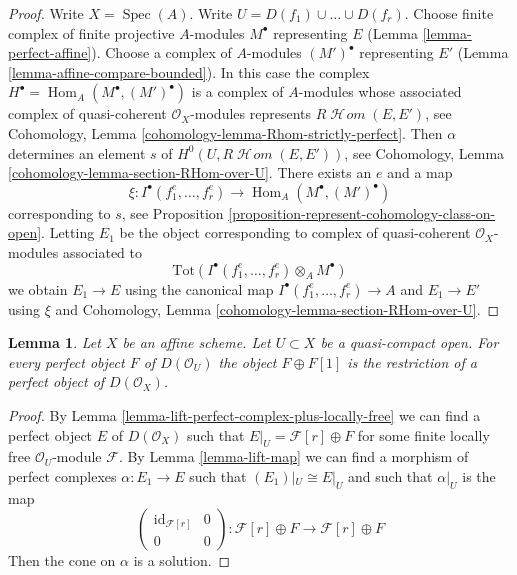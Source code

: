 \documentclass{stacks-project}
\theoremstyle{plain}
\newtheorem{lemma}[subsection]{Lemma}
\theoremstyle{definition}
\theoremstyle{remark}
\numberwithin{equation}{subsection}
\def\Spec{\mathop{\mathrm{Spec}}}
\def\Hom{\mathop{\mathrm{Hom}}\nolimits}
\def\SheafHom{\mathop{\mathcal{H}\!\mathit{om}}\nolimits}
\begin{document}
\begin{proof}
Write $X = \Spec(A)$. Write $U = D(f_1) \cup \ldots \cup D(f_r)$. Choose
finite complex of finite projective $A$-modules $M^\bullet$ representing
$E$ (Lemma \ref{lemma-perfect-affine}). Choose a complex of $A$-modules
$(M')^\bullet$ representing $E'$ (Lemma \ref{lemma-affine-compare-bounded}).
In this case the complex $H^\bullet = \Hom_A(M^\bullet, (M')^\bullet)$
is a complex of $A$-modules whose associated complex of quasi-coherent
$\mathcal{O}_X$-modules represents $R\SheafHom(E, E')$, see
Cohomology, Lemma \ref{cohomology-lemma-Rhom-strictly-perfect}.
Then $\alpha$ determines an element $s$ of $H^0(U, R\SheafHom(E, E'))$, see
Cohomology, Lemma \ref{cohomology-lemma-section-RHom-over-U}.
There exists an $e$ and a map
$$
\xi : I^\bullet(f_1^e, \ldots, f_r^e) \to \Hom_A(M^\bullet, (M')^\bullet)
$$
corresponding to $s$, see
Proposition \ref{proposition-represent-cohomology-class-on-open}.
Letting $E_1$ be the object corresponding to
complex of quasi-coherent $\mathcal{O}_X$-modules
associated to
$$
\text{Tot}(I^\bullet(f_1^e, \ldots, f_r^e) \otimes_A M^\bullet)
$$
we obtain $E_1 \to E$ using the canonical map
$I^\bullet(f_1^e, \ldots, f_r^e) \to A$ and $E_1 \to E'$
using $\xi$ and
Cohomology, Lemma \ref{cohomology-lemma-section-RHom-over-U}.
\end{proof}

\begin{lemma}
\label{lemma-lift-perfect-complex-plus-shift}
Let $X$ be an affine scheme. Let $U \subset X$ be a quasi-compact open.
For every perfect object $F$ of $D(\mathcal{O}_U)$
the object $F \oplus F[1]$ is the restriction of
a perfect object of $D(\mathcal{O}_X)$.
\end{lemma}

\begin{proof}
By Lemma \ref{lemma-lift-perfect-complex-plus-locally-free}
we can find a perfect object $E$ of $D(\mathcal{O}_X)$
such that $E|_U = \mathcal{F}[r] \oplus F$ for some finite locally
free $\mathcal{O}_U$-module $\mathcal{F}$.
By Lemma \ref{lemma-lift-map} we can find a morphism of
perfect complexes $\alpha : E_1 \to E$ such that $(E_1)|_U \cong E|_U$
and such that $\alpha|_U$ is the map
$$
\left(
\begin{matrix}
\text{id}_{\mathcal{F}[r]} & 0 \\
0 & 0
\end{matrix}
\right)
:
\mathcal{F}[r] \oplus F \to \mathcal{F}[r] \oplus F
$$
Then the cone on $\alpha$ is a solution.
\end{proof}
\end{document}
